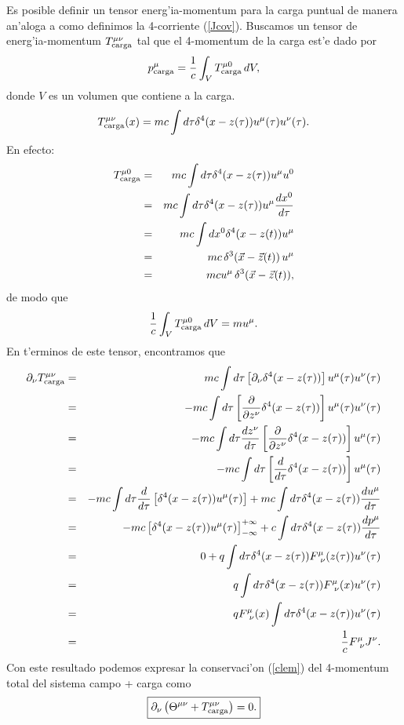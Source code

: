 Es posible definir un tensor energ'ia-momentum para la carga puntual de manera
an'aloga a como definimos la 4-corriente (\ref{Jcov}). Buscamos un tensor de
energ'ia-momentum $T_{\rm carga}^{\mu\nu}$ tal que el 4-momentum de la carga
est'e dado por
\begin{equation}
p^\mu_{\rm carga}=\frac{1}{c}\int_V T_{\rm carga}^{\mu 0}\,dV,
\end{equation}
donde $V$ es un volumen que contiene a la carga.
\begin{equation}
T_{\rm carga}^{\mu\nu}(x)=mc\int d\tau \delta^4(x-z(\tau)) u^\mu(\tau)
u^\nu(\tau).
\end{equation}
En efecto:
\begin{eqnarray}
T_{\rm carga}^{\mu 0}&=&mc\int d\tau \delta^4(x-z(\tau)) u^\mu u^0 \\
&=&mc\int d\tau \delta^4(x-z(\tau)) u^\mu \frac{dx^0}{d\tau} \\
&=&mc\int dx^0 \delta^4(x-z(t)) u^\mu  \\
&=&mc\,\delta^3(\vec{x}-\vec{z}(t))\, u^\mu \\
&=&mc u^\mu \, \delta^3(\vec{x}-\vec{z}(t)),
\end{eqnarray}
de modo que
\begin{equation}
\frac{1}{c}\int_V T_{\rm carga}^{\mu 0}\,dV=m u^\mu.
\end{equation}
En t'erminos de este tensor, encontramos que
\begin{eqnarray}
\partial_\nu T_{\rm carga}^{\mu\nu}&=&mc\int d\tau \left[ \partial_\nu
\delta^4(x-z(\tau))\right]  u^\mu(\tau) u^\nu(\tau) \\
&=&-mc\int d\tau \left[ \frac{\partial}{\partial z^\nu}
\delta^4(x-z(\tau))\right]  u^\mu(\tau)u^\nu(\tau) \\
&=&-mc\int d\tau \frac{dz^\nu}{d\tau}\left[ \frac{\partial}{\partial z^\nu}
\delta^4(x-z(\tau))\right]  u^\mu(\tau)\\
&=&-mc\int d\tau \left[\frac{d}{d\tau}\delta^4(x-z(\tau))\right]  u^\mu(\tau)\\
&=&-mc\int d\tau  \frac{d}{d\tau}\left[\delta^4(x-z(\tau))
u^\mu(\tau)\right]+mc\int d\tau  \delta^4(x-z(\tau)) \frac{du^\mu}{d\tau}\\
&=&-mc\left[\delta^4(x-z(\tau)) u^\mu(\tau)\right]^{+\infty}_{-\infty}+c\int
d\tau  \delta^4(x-z(\tau)) \frac{dp^\mu}{d\tau}\\
&=&0+q\int d\tau  \delta^4(x-z(\tau))F^\mu_{\ \nu}(z(\tau))u^\nu(\tau)\\
&=&q\int d\tau  \delta^4(x-z(\tau))F^\mu_{\ \nu}(x)u^\nu(\tau)\\
&=&qF^\mu_{\ \nu}(x)\int d\tau  \delta^4(x-z(\tau))u^\nu(\tau)\\
&=&\frac{1}{c}F^\mu_{\ \nu}J^\nu.
\end{eqnarray}
Con este resultado podemos expresar la conservaci'on (\ref{clem}) del 4-momentum
total del sistema campo + carga como
\begin{equation}
\boxed{\partial_\nu \left( \Theta^{\mu\nu}+T_{\rm carga}^{\mu\nu}\right) =0.}
\label{clem2}
\end{equation}
